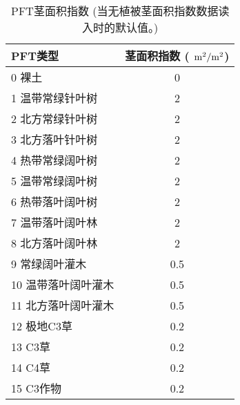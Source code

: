 \begin{table}[]
    \centering
    \caption{PFT茎面积指数 (当无植被茎面积指数数据读入时的默认值。)}
    \label{tab:PFT茎面积指数}
    \begin{tabular}{@{}lc@{}}
    \toprule
    PFT类型       & 茎面积指数 ( $\rm m^2/m^2$) \\ \midrule
    0 裸土        & 0              \\
    1 温带常绿针叶树   & 2              \\
    2 北方常绿针叶树   & 2              \\
    3 北方落叶针叶树   & 2              \\
    4 热带常绿阔叶树   & 2              \\
    5 温带常绿阔叶树   & 2              \\
    6 热带落叶阔叶树   & 2              \\
    7 温带落叶阔叶林   & 2              \\
    8 北方落叶阔叶林   & 2              \\
    9 常绿阔叶灌木    & 0.5            \\
    10 温带落叶阔叶灌木 & 0.5            \\
    11 北方落叶阔叶灌木 & 0.5            \\
    12 极地C3草    & 0.2            \\
    13 C3草      & 0.2            \\
    14 C4草      & 0.2            \\
    15 C3作物     & 0.2            \\ \bottomrule
    \end{tabular}
\end{table}


